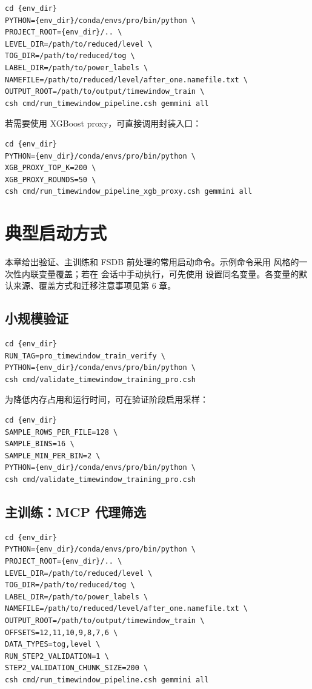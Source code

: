 \documentclass{fduthesis}
\newcommand{\code}[1]{{\ttfamily\small\urlstyle{tt}\path{#1}}}
\begin{document}
\begin{lstlisting}
cd {env_dir}
PYTHON={env_dir}/conda/envs/pro/bin/python \
PROJECT_ROOT={env_dir}/.. \
LEVEL_DIR=/path/to/reduced/level \
TOG_DIR=/path/to/reduced/tog \
LABEL_DIR=/path/to/power_labels \
NAMEFILE=/path/to/reduced/level/after_one.namefile.txt \
OUTPUT_ROOT=/path/to/output/timewindow_train \
csh cmd/run_timewindow_pipeline.csh gemmini all
\end{lstlisting}

若需要使用 XGBoost proxy，可直接调用封装入口：

\begin{lstlisting}
cd {env_dir}
PYTHON={env_dir}/conda/envs/pro/bin/python \
XGB_PROXY_TOP_K=200 \
XGB_PROXY_ROUNDS=50 \
csh cmd/run_timewindow_pipeline_xgb_proxy.csh gemmini all
\end{lstlisting}

\chapter{典型启动方式}

本章给出验证、主训练和 FSDB 前处理的常用启动命令。示例命令采用 \code{bash/sh} 风格的一次性内联变量覆盖；若在 \code{csh/tcsh} 会话中手动执行，可先使用 \code{setenv} 设置同名变量。各变量的默认来源、覆盖方式和迁移注意事项见第 6 章。

\section{小规模验证}

\begin{lstlisting}
cd {env_dir}
RUN_TAG=pro_timewindow_train_verify \
PYTHON={env_dir}/conda/envs/pro/bin/python \
csh cmd/validate_timewindow_training_pro.csh
\end{lstlisting}

为降低内存占用和运行时间，可在验证阶段启用采样：

\begin{lstlisting}
cd {env_dir}
SAMPLE_ROWS_PER_FILE=128 \
SAMPLE_BINS=16 \
SAMPLE_MIN_PER_BIN=2 \
PYTHON={env_dir}/conda/envs/pro/bin/python \
csh cmd/validate_timewindow_training_pro.csh
\end{lstlisting}

\section{主训练：MCP 代理筛选}

\begin{lstlisting}
cd {env_dir}
PYTHON={env_dir}/conda/envs/pro/bin/python \
PROJECT_ROOT={env_dir}/.. \
LEVEL_DIR=/path/to/reduced/level \
TOG_DIR=/path/to/reduced/tog \
LABEL_DIR=/path/to/power_labels \
NAMEFILE=/path/to/reduced/level/after_one.namefile.txt \
OUTPUT_ROOT=/path/to/output/timewindow_train \
OFFSETS=12,11,10,9,8,7,6 \
DATA_TYPES=tog,level \
RUN_STEP2_VALIDATION=1 \
STEP2_VALIDATION_CHUNK_SIZE=200 \
csh cmd/run_timewindow_pipeline.csh gemmini all
\end{lstlisting}
\end{document}
